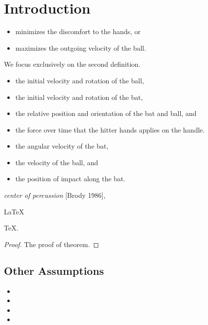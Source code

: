 \documentclass[../mcmpaper]{subfiles}
\begin{document}
	\section{Introduction}
	\lipsum[2]
	\begin{itemize}
		\item minimizes the discomfort to the hands, or
		\item maximizes the outgoing velocity of the ball.
	\end{itemize}
	We focus exclusively on the second definition.
	
	\begin{itemize}
		\item the initial velocity and rotation of the ball,
		\item the initial velocity and rotation of the bat,
		\item the relative position and orientation of the bat and ball, and
		\item the force over time that the hitter hands applies on the handle.
	\end{itemize}
	\lipsum[3]
	\begin{itemize}
		\item the angular velocity of the bat,
		\item the velocity of the ball, and
		\item the position of impact along the bat.
	\end{itemize}
	\lipsum[4]
	\emph{center of percussion} [Brody 1986], \lipsum[5]
	
	\begin{Theorem} \label{thm:latex}
		\LaTeX
	\end{Theorem}
	\begin{Lemma} \label{thm:tex}
		\TeX .
	\end{Lemma}
	\begin{proof}
		The proof of theorem.
	\end{proof}
	
	\subsection{Other Assumptions}
	\lipsum[6]
	\begin{itemize}
		\item
		\item
		\item
		\item
	\end{itemize}
	
	\lipsum[7]
\end{document}
